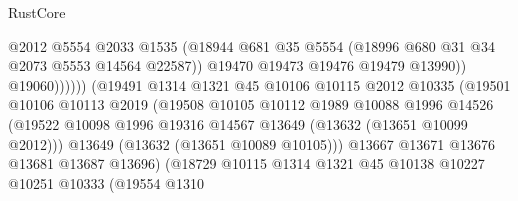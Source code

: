 \begin{lexlean}{RustCore}
\begin{coremodule}
                                            @2012
                                            @5554
                                            @2033
                                            @1535
                                            (@18944
                                              @681
                                              @35
                                              @5554
                                              (@18996 @680 @31 @34 @2073 @5553 @14564 @22587))
                                            @19470
                                            @19473
                                            @19476
                                            @19479
                                            @13990))
                                        @19060))))))
                            (@19491
                              @1314
                              @1321
                              @45
                              @10106
                              @10115
                              @2012
                              @10335
                              (@19501
                                @10106
                                @10113
                                @2019
                                (@19508
                                  @10105
                                  @10112
                                  @1989
                                  @10088
                                  @1996
                                  @14526
                                  (@19522
                                    @10098
                                    @1996
                                    @19316
                                    @14567
                                    @13649
                                    (@13632 (@13651 @10099 @2012)))
                                  @13649
                                  (@13632 (@13651 @10089 @10105)))
                                @13667
                                @13671
                                @13676
                                @13681
                                @13687
                                @13696)
                              (@18729
                                @10115
                                @1314
                                @1321
                                @45
                                @10138
                                @10227
                                @10251
                                @10333
                                (@19554
                                  @1310

\end{coremodule}
\end{lexlean}
